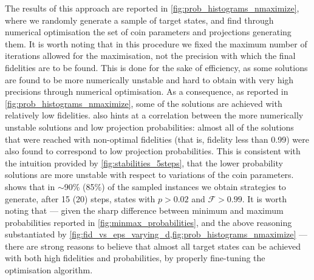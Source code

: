 The results of this approach are reported in \cref{fig:prob_histograms_nmaximize}, where we randomly generate a sample of target states, and find through numerical optimisation the set of coin parameters and projections generating them.
It is worth noting that in this procedure we fixed the maximum number of iterations allowed for the maximisation, not the precision with which the final fidelities are to be found.
This is done for the sake of efficiency, as some solutions are found to be more numerically unstable and hard to obtain with very high precisions through numerical optimisation.
As a consequence, as reported in \cref{fig:prob_histograms_nmaximize}, some of the solutions are achieved with relatively low fidelities.
 also hints at a correlation between the more numerically unstable solutions and low projection probabilities:
almost all of the solutions that were reached with non-optimal fidelities (that is, fidelity less than 0.99) were also found to correspond to low projection probabilities.
This is consistent with the intuition provided by \cref{fig:stabilities_5steps},
that the lower probability solutions are more unstable with respect to variations of the coin parameters.
 shows that in $\sim$90\% (85\%) of the sampled instances we obtain strategies to generate, after 15 (20) steps, states with $p > 0.02$ and $\mathcal F > 0.99$.
It is worth noting that --- given the sharp difference between minimum and maximum probabilities reported in \cref{fig:minmax_probabilities}, and the above reasoning substantiated by \cref{fig:fid_vs_eps_varying_d,fig:prob_histograms_nmaximize} ---
there are strong reasons to believe that almost all target states can be achieved with both high fidelities and probabilities,
by properly fine-tuning the optimisation algorithm.

